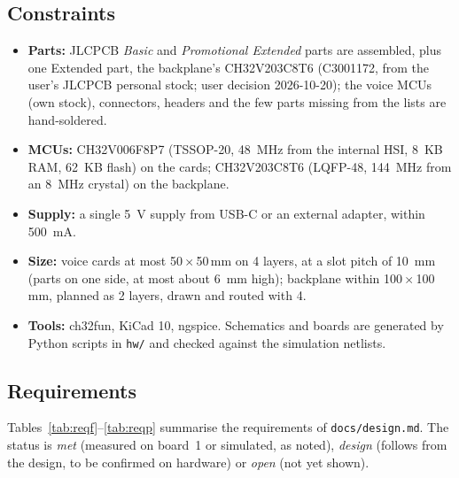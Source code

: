 \documentclass[11pt,a4paper]{article}
\newcommand{\file}[1]{\texttt{#1}}
\begin{document}
\subsection{Constraints}
\begin{itemize}
  \item \textbf{Parts:} JLCPCB \emph{Basic} and \emph{Promotional Extended} parts are assembled, plus one Extended
    part, the backplane's CH32V203C8T6 (C3001172, from the user's JLCPCB personal stock; user decision 2026-10-20);
    the voice MCUs (own stock), connectors, headers and the few parts missing from the lists are hand-soldered.
  \item \textbf{MCUs:} CH32V006F8P7 (TSSOP-20, \SI{48}{MHz} from the internal HSI, \SI{8}{KB} RAM, \SI{62}{KB} flash)
    on the cards; CH32V203C8T6 (LQFP-48, \SI{144}{MHz} from an \SI{8}{MHz} crystal) on the backplane.
  \item \textbf{Supply:} a single \SI{5}{V} supply from USB-C or an external adapter, within \SI{500}{mA}.
  \item \textbf{Size:} voice cards at most 50\,$\times$\,50\,mm on 4 layers, at a slot pitch of \SI{10}{mm} (parts on one
    side, at most about \SI{6}{mm} high); backplane within 100\,$\times$\,100\,mm, planned as 2 layers, drawn and routed with 4.
  \item \textbf{Tools:} ch32fun, KiCad 10, ngspice. Schematics and boards are generated by Python scripts in
    \file{hw/} and checked against the simulation netlists.
\end{itemize}

\subsection{Requirements}
Tables~\ref{tab:reqf}--\ref{tab:reqp} summarise the requirements of \file{docs/design.md}. The status is
\emph{met} (measured on board~1 or simulated, as noted), \emph{design} (follows from the design, to be confirmed on
hardware) or \emph{open} (not yet shown).
\end{document}
